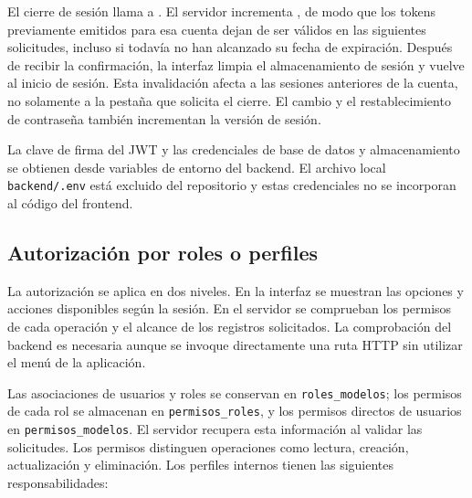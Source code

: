 \documentclass[12pt,letterpaper]{report}
\begin{document}
El cierre de sesión llama a . El servidor incrementa
, de modo que los tokens previamente emitidos para
esa cuenta dejan de ser válidos en las siguientes solicitudes, incluso
si todavía no han alcanzado su fecha de expiración. Después de recibir la
confirmación, la interfaz limpia el almacenamiento de sesión y vuelve al
inicio de sesión. Esta invalidación afecta a las sesiones anteriores de
la cuenta, no solamente a la pestaña que solicita el cierre. El cambio y
el restablecimiento de contraseña también incrementan la versión de sesión.

La clave de firma del JWT y las credenciales de base de datos y almacenamiento
se obtienen desde variables de entorno del backend. El archivo local
\texttt{backend/.env} está excluido del repositorio y estas credenciales
no se incorporan al código del frontend.

\subsection{Autorización por roles o perfiles}

La autorización se aplica en dos niveles. En la interfaz se muestran las
opciones y acciones disponibles según la sesión. En el servidor se
comprueban los permisos de cada operación y el alcance de los registros
solicitados. La comprobación del backend es necesaria aunque se invoque
directamente una ruta HTTP sin utilizar el menú de la aplicación.

Las asociaciones de usuarios y roles se conservan en
\texttt{roles\_modelos}; los permisos de cada rol se almacenan en
\texttt{permisos\_roles}, y los permisos directos de usuarios en
\texttt{permisos\_modelos}. El servidor recupera esta información al
validar las solicitudes. Los permisos distinguen operaciones como lectura,
creación, actualización y eliminación. Los perfiles internos tienen las
siguientes responsabilidades:
\end{document}
